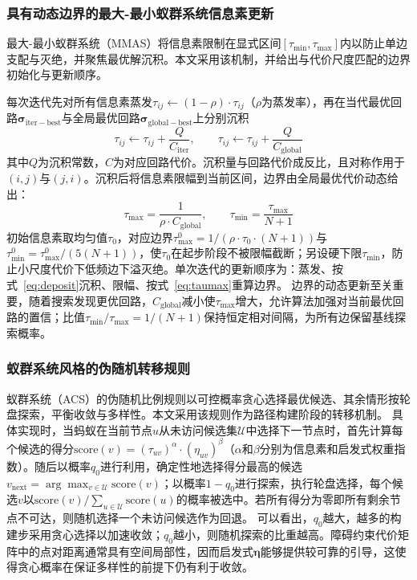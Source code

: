 \documentclass[lettersize,journal]{IEEEtran}
\begin{document}
\subsubsection{具有动态边界的最大-最小蚁群系统信息素更新}
最大-最小蚁群系统（MMAS）\textcolor{blue}{\cite{ref23}}将信息素限制在显式区间$[\tau_{\min}, \tau_{\max}]$内以防止单边支配与灭绝，并聚焦最优解沉积。本文采用该机制，并给出与代价尺度匹配的边界初始化与更新顺序。

每次迭代先对所有信息素蒸发$\tau_{ij} \leftarrow (1 - \rho) \cdot \tau_{ij}$（$\rho$为蒸发率），再在当代最优回路$\bm{\sigma}_{\mathrm{iter-best}}$与全局最优回路$\bm{\sigma}_{\mathrm{global-best}}$上分别沉积
\begin{equation}
\tau_{ij} \leftarrow \tau_{ij} + \frac{Q}{C_{\mathrm{iter}}}, \qquad
\tau_{ij} \leftarrow \tau_{ij} + \frac{Q}{C_{\mathrm{global}}}
\label{eq:deposit}
\end{equation}
其中$Q$为沉积常数，$C$为对应回路代价。沉积量与回路代价成反比，且对称作用于$(i,j)$与$(j,i)$。沉积后将信息素限幅到当前区间，边界由全局最优代价动态给出：
\begin{equation}
\tau_{\max} = \frac{1}{\rho \cdot C_{\mathrm{global}}}, \qquad
\tau_{\min} = \frac{\tau_{\max}}{N+1}
\label{eq:taumax}
\end{equation}
初始信息素取均匀值$\tau_0$，对应边界$\tau_{\max}^{0} = 1/(\rho \cdot \tau_0 \cdot (N+1))$与$\tau_{\min}^{0} = \tau_{\max}^{0}/(5(N+1))$，使$\tau_0$在起步阶段不被限幅截断；另设硬下限$\tau_{\min}$，防止小尺度代价下低频边下溢灭绝。单次迭代的更新顺序为：蒸发、按式~\textcolor{blue}{\eqref{eq:deposit}}沉积、限幅、按式~\textcolor{blue}{\eqref{eq:taumax}}重算边界。
边界的动态更新至关重要，随着搜索发现更优回路，$C_{\mathrm{global}}$减小使$\tau_{\max}$增大，允许算法加强对当前最优回路的置信；比值$\tau_{\min}/\tau_{\max} = 1/(N+1)$保持恒定相对间隔，为所有边保留基线探索概率。
\subsubsection{蚁群系统风格的伪随机转移规则}
蚁群系统（ACS）的伪随机比例规则\textcolor{blue}{\cite{ref22}}以可控概率贪心选择最优候选、其余情形按轮盘探索，平衡收敛与多样性。本文采用该规则作为路径构建阶段的转移机制。
具体实现时，当蚂蚁在当前节点$u$从未访问候选集$\mathcal{U}$中选择下一节点时，首先计算每个候选的得分$\mathrm{score}(v) = (\tau_{uv})^{\alpha} \cdot (\eta_{uv})^{\beta}$（$\alpha$和$\beta$分别为信息素和启发式权重指数）。随后以概率$q_0$进行利用，确定性地选择得分最高的候选$v_{\mathrm{next}} = \arg\max_{v \in \mathcal{U}} \mathrm{score}(v)$；以概率$1 - q_0$进行探索，执行轮盘选择，每个候选$v$以$\mathrm{score}(v) / \sum_{u \in \mathcal{U}} \mathrm{score}(u)$的概率被选中。若所有得分为零即所有剩余节点不可达，则随机选择一个未访问候选作为回退。
可以看出，$q_0$越大，越多的构建步采用贪心选择以加速收敛；$q_0$越小，则随机探索的比重越高。障碍约束代价矩阵中的点对距离通常具有空间局部性，因而启发式$\bm{\eta}$能够提供较可靠的引导，这使得贪心概率在保证多样性的前提下仍有利于收敛。
\end{document}
